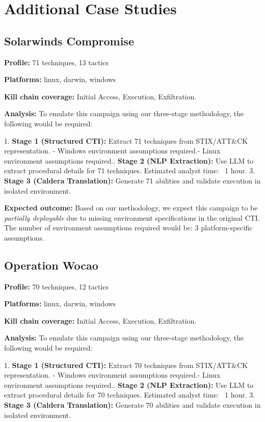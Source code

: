 \section{Additional Case Studies}
\label{sec:additional_case_studies}


\subsection*{Solarwinds Compromise}

\textbf{Profile:} 71 techniques, 13 tactics

\textbf{Platforms:} linux, darwin, windows

\textbf{Kill chain coverage:}
Initial Access, Execution, Exfiltration.

\textbf{Analysis:} To emulate this campaign using our three-stage methodology,
the following would be required:

1. \textbf{Stage 1 (Structured CTI):} Extract 71 techniques
   from STIX/ATT&CK representation.
   - Windows environment assumptions required.\n   - Linux environment assumptions required.. \textbf{Stage 2 (NLP Extraction):} Use LLM to extract procedural details
   for 71 techniques. Estimated analyst time: ~1 hour.
3. \textbf{Stage 3 (Caldera Translation):} Generate 71
   abilities and validate execution in isolated environment.

\textbf{Expected outcome:} Based on our methodology, we expect this campaign
to be \textit{partially deployable} due to missing environment specifications
in the original CTI. The number of environment assumptions required would be:
3 platform-specific assumptions.



\subsection*{Operation Wocao}

\textbf{Profile:} 70 techniques, 12 tactics

\textbf{Platforms:} linux, darwin, windows

\textbf{Kill chain coverage:}
Initial Access, Execution, Exfiltration.

\textbf{Analysis:} To emulate this campaign using our three-stage methodology,
the following would be required:

1. \textbf{Stage 1 (Structured CTI):} Extract 70 techniques
   from STIX/ATT&CK representation.
   - Windows environment assumptions required.\n   - Linux environment assumptions required.. \textbf{Stage 2 (NLP Extraction):} Use LLM to extract procedural details
   for 70 techniques. Estimated analyst time: ~1 hour.
3. \textbf{Stage 3 (Caldera Translation):} Generate 70
   abilities and validate execution in isolated environment.


